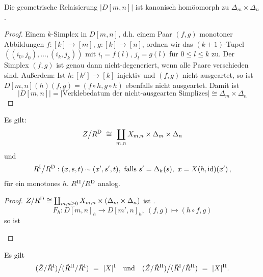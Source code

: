 \begin{lemma}
  \label{lemma:11}
  Die geometrische Relaisierung $|D[m,n]|$ ist kanonisch homöomorph zu
  $\Delta_m\times \Delta_n$.
\end{lemma}
\begin{proof}
  Einem $k$-Simplex in $D[m,n]$, d.h. einem Paar $(f,g)$ monotoner
  Abbildungen $f:[k]\to[m]$, $g:[k]\to [n]$, ordnen wir das $(k+1)$-Tupel
  $((i_0,j_0),\ldots,(i_k,j_k))$ mit $i_l = f(l)$, $j_l=g(l)$ für
  $0\leq l\leq k$ zu. Der Simplex $(f,g)$ ist genau dann nicht-degeneriert,
  wenn alle Paare verschieden sind. Außerdem: Ist $h:[k']\to[k]$ injektiv und
  $(f,g)$ nicht ausgeartet, so ist $D[m,n](h)(f,g) = (f\circ h, g\circ h)$
  ebenfalls nicht ausgeartet. Damit ist
  \[|D[m,n]| = |\text{Verklebedatum der nicht-ausgearten Simplizes}|
    \cong \Delta_m\times\Delta_n\]
\end{proof}


\begin{folgerung}
  Es gilt:
  \[ Z\big/ R^\mathrm{D} \ \cong\  \coprod_{m,n} X_{m,n}\times \Delta_m
    \times \Delta_n\]
  und
  \[ R^\mathrm{I} \big/R^\mathrm{D}: (x,s,t) \sim(x',s',t),
    \text{ falls } s'=\Delta_h(s),\ x = X(h,\operatorname{id})(x')\,,\]
  für ein monotones $h$. $R^\mathrm{II}/R^\mathrm{D}$ analog.
\end{folgerung}
\begin{proof}
  $Z/R^\mathrm{D} \cong\coprod_{m,n\geq 0} X_{m,n} \times (\Delta_m\times \Delta_n)$
  ist .
  \[ F_h: D[m,n]_h \to D[m',n]_h,\ (f,g) \mapsto (h\circ f, g)\]
  so ist
  \begin{center}
  \end{center}
\end{proof}



\begin{folgerung}
  Es gilt
  \[ (\tilde Z / \tilde R^\mathrm{I})\big/ (\tilde R^\mathrm{II}/\tilde R^\mathrm{I})
    \ =\  |X|^\mathrm{I} \quad\text{und}\quad
    (\tilde Z/\tilde R^\mathrm{II}) \big/ (\tilde R^\mathrm{I} / \tilde R^\mathrm{II})
    \ =\  |X|^\mathrm{II}.\]
\end{folgerung}



